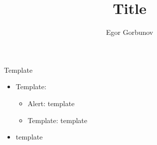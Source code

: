 
\makeatletter
{}
\makeatother
\graphicspath{{./fig/}}

\title{Title}
\author[Egor Gorbunov]{
	Egor Gorbunov
}


\maketitle

\begin{frame}{Template}
\begin{itemize}
	\item Template:
		\begin{itemize}
			\item \alert{Alert}: template
			\item \alert{Template}: template
		\end{itemize}
	\item template
\end{itemize}
\end{frame}

